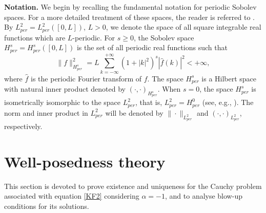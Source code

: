 \documentclass[12pt,reqno,a4paper]{amsart} %
\numberwithin{equation}{section}
\numberwithin{figure}{section}
\begin{document}
 \textbf{Notation.} 
 We begin by recalling the fundamental notation for periodic Sobolev spaces. For a more detailed treatment of these spaces, the reader is referred to \cite{Iorio}. By $L^2_{per}=L^2_{per}([0,L])$, $L>0$, we denote the space of all square integrable real functions which are $L$-periodic. For $s\geq0$, the Sobolev space
$H^s_{per}=H^s_{per}([0,L])$
is the set of all periodic real functions such that\noindent
$$
\|f\|^2_{H^s_{per}}= L \sum_{k=-\infty}^{+\infty}(1+|k|^2)^s|\hat{f}(k)|^2 <+\infty,
$$\noindent
where $\hat{f}$ is the periodic Fourier transform of $f$. The space $H^s_{per}$ is a  Hilbert space with natural inner product denoted by $(\cdot, \cdot)_{H^s_{per}}$. When $s=0$, the space $H^s_{per}$ is isometrically isomorphic to the space  $L^2_{per}$, that is, $L^2_{per}=H^0_{per}$ (see, e.g., \cite{Iorio}). The norm and inner product in $L^2_{per}$ will be denoted by $\|\cdot \|_{L^2_{per}}$ and $(\cdot, \cdot)_{L^2_{per}}$, respectively. 

\section{Well-posedness theory}\label{section3}

 This section is devoted to prove existence and uniqueness for the Cauchy problem associated with equation \eqref{KF2} considering $\alpha=-1$, and to analyse blow-up conditions for its solutions.
 
\end{document}
